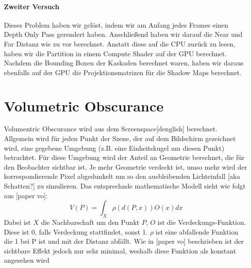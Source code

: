 \documentclass[runningheaders,a4paper]{llncs}
\begin{document}
\paragraph{Zweiter Versuch}
Dieses Problem haben wir gelöst, indem wir am Anfang jedes Frames einen Depth Only Pass gerendert haben.
Anschließend haben wir darauf die Near und Far Distanz wie zu vor berechnet.
Anstatt diese auf die CPU zurück zu lesen, haben wir die Partition in einem Compute Shader auf der GPU berechnet.
Nachdem die Bounding Boxen der Kaskaden berechnet waren, haben wir daraus ebenfalls auf der GPU die Projektionsmatrizen für die Shadow Maps berechnet.




\section{Volumetric Obscurance}

Volumentric Obscurance wird aus dem Screenspace[denglish] berechnet. Allgemein wird für jeden Punkt der Szene, der auf
dem Bildschirm gezeichnet wird, eine gegebene Umgebung (z.B. eine Einheitskugel um diesen Punkt) betrachtet.
Für diese Umgebung wird der Anteil an Geometrie berechnet, die für den Beobachter sichtbar ist. Je mehr Geometrie
verdeckt ist, umso mehr wird der korrespondierende Pixel abgedunkelt um so den ausbleibenden Lichteinfall
[aka Schatten?] zu simulieren.
Das entsprechnde mathematische Modell sieht wie folgt aus [paper vo]:
$$
V(P) = \int_{X} \rho (d(P,x))O(x)dx
$$
Dabei ist $X$ die Nachbarschaft um den Punkt $P$, $O$ ist die Verdeckungs-Funktion. Diese
ist 0, falls Verdeckung stattfindet, sonst 1. $\rho$ ist eine abfallende Funktion
die 1 bei P ist und mit der Distanz abfällt. Wie in [paper vo] beschrieben ist der 
sichtbare Effekt jedoch nur sehr minimal, weshalb diese Funktion als konstant angesehen 
wird \cite{voPaper}
\end{document}
